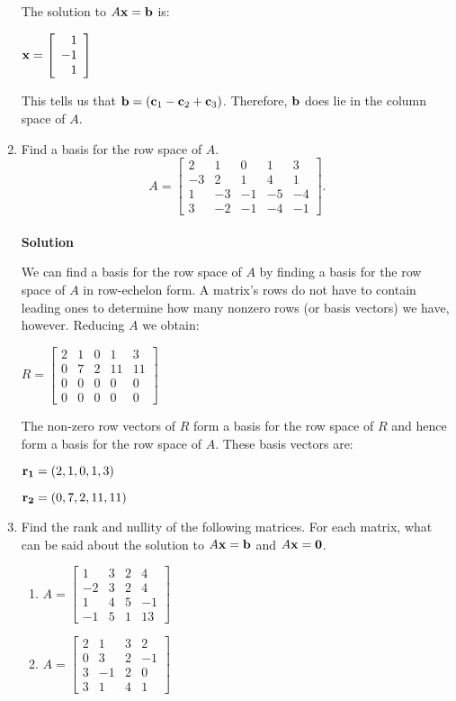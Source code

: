 \begin{enumerate}
\noindent The solution to $A{\bf x}={\bf b}$ is:

${\bf x}=\left [ \begin{array}{r}
                               1\\
                               -1\\
                               1\end{array} \right]$

\noindent This tells us that ${\bf b}=({\bf c}_1-{\bf c}_2+{\bf
c}_3)$.  Therefore, ${\bf b}$ does lie in the column space of $A$.
\item Find a basis for the row space of $A$.
$$A=\left [ \begin{array}{rrrrr} 2&1&0&1&3\\ -3&2&1&4&1\\
1&-3&-1&-5&-4\\ 3&-2&-1&-4&-1\end{array} \right ].$$\\

\noindent \textbf{Solution}

\noindent We can find a basis for the row space of $A$ by finding
a basis for the row space of $A$ in row-echelon form.  A matrix's
rows do not have to contain leading ones to determine how many
nonzero rows (or basis vectors) we have, however.  Reducing $A$ we
obtain:

$R=\left [ \begin{array}{rrrrr}
                         2&1&0&1&3\\
                         0&7&2&11&11\\
                         0&0&0&0&0\\
                         0&0&0&0&0 \end{array} \right ]$

\noindent The non-zero row vectors of $R$ form a basis for the row
space of $R$ and hence form a basis for the row space of $A$.
These basis vectors are:

${\bf r_{1}}=(2,1,0,1,3)$

${\bf r_{2}}=(0,7,2,11,11)$

\item Find the rank and nullity of the following matrices.
For each matrix, what can be said about the solution to $A{\bf
x}={\bf b}$ and $A{\bf x}={\bf 0}$.
\begin{enumerate}
\item $A=\left [ \begin{array}{rrrr} 1&3&2&4\\-2&3&2&4\\1&4&5&-1\\
-1&5&1&13\end{array} \right ] $
\item  $A=\left [ \begin{array}{rrrr} 2&1&3&2\\0&3&2&-1\\3&-1&2&0\\
3&1&4&1\end{array} \right ] $
\end{enumerate}


\end{enumerate}
